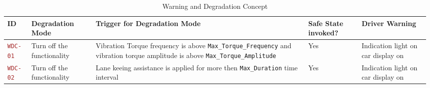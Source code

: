 \begin{table}[!htpb]
\caption{Warning and Degradation Concept}
\begin{center}
\scriptsize
\renewcommand{\arraystretch}{1.4}
\begin{tabular}{ L{1.8cm}|L{2.5cm}|L{4.2cm}|L{2.2cm}|L{2.2cm}  }
\hline
{}
ID &
Degradation Mode &
Trigger for Degradation Mode &
Safe State invoked? &
Driver Warning
\\\hline
\textcolor{brown}{\texttt{WDC-01}}  &
Turn off the functionality &
Vibration Torque frequency is above \textcolor{dark-red}{\texttt{Max\_Torque\_Frequency}}
and vibration torque amplitude is above \textcolor{dark-red}{\texttt{Max\_Torque\_Amplitude}} &
Yes  &
Indication light on car display on\\\hline
\textcolor{brown}{\texttt{WDC-02}}  &
Turn off the functionality  &
Lane keeing assistance is applied for more then \textcolor{dark-red}{\texttt{Max\_Duration}} 
time interval &
Yes  &
Indication light on car display on\\\hline
\end{tabular}
\end{center}
\label{tab:wdc}
\end{table}
